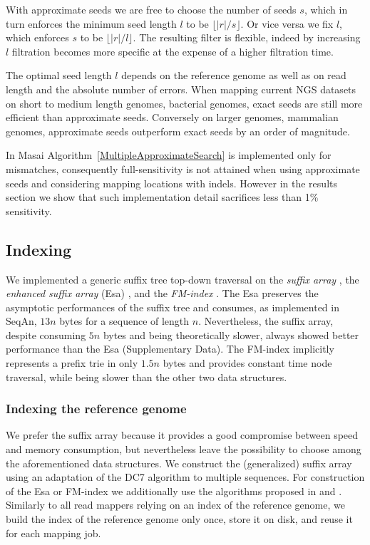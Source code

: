 With approximate seeds we are free to choose the number of seeds $s$, which in turn enforces the minimum seed length $l$ to be $\lfloor |r|/s \rfloor$.
Or vice versa we fix $l$, which enforces $s$ to be $\lfloor |r|/l \rfloor$.
The resulting filter is flexible, indeed by increasing $l$ filtration becomes more specific at the expense of a higher filtration time.

The optimal seed length $l$ depends on the reference genome as well as on read length and the absolute number of errors.
When mapping current NGS datasets on short to medium length genomes, \eg bacterial genomes, exact seeds are still more efficient than approximate seeds.
Conversely on larger genomes, \eg mammalian genomes, approximate seeds outperform exact seeds by an order of magnitude.

In Masai Algorithm~\ref{MultipleApproximateSearch} is implemented only for mismatches, consequently full-sensitivity is not attained when using approximate seeds and considering mapping locations with indels.
However in the results section we show that such implementation detail sacrifices less than 1\% sensitivity.

\subsection{Indexing}

We implemented a generic suffix tree top-down traversal on the \emph{suffix array} \citep{Manber1990}, the \emph{enhanced suffix array} (Esa) \citep{Abouelhoda2004}, and the \emph{FM-index} \citep{Ferragina2001}.
The Esa preserves the asymptotic performances of the suffix tree and consumes, as implemented in SeqAn, $13n$ bytes for a sequence of length $n$.
Nevertheless, the suffix array, despite consuming $5n$ bytes and being theoretically slower, always showed better performance than the Esa (Supplementary Data).
The FM-index implicitly represents a prefix trie in only $1.5n$ bytes and provides constant time node traversal, while being slower than the other two data structures.

\subsubsection{Indexing the reference genome}

We prefer the suffix array because it provides a good compromise between speed and memory consumption, but nevertheless leave the possibility to choose among the aforementioned data structures.
We construct the (generalized) suffix array using an adaptation of the DC7 algorithm \citep{Dementiev2008} to multiple sequences.
For construction of the Esa or FM-index we additionally use the algorithms proposed in \citep{Kasai2001,Abouelhoda2004} and \citep{Grossi2003}.
Similarly to all read mappers relying on an index of the reference genome, we build the index of the reference genome only once, store it on disk, and reuse it for each mapping job.

